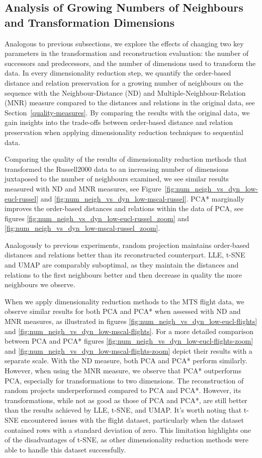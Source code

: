 \documentclass[pdftex,12pt,a4paper]{report}
\begin{document}
\FloatBarrier
\subsection{Analysis of Growing Numbers of Neighbours and Transformation Dimensions}

Analogous to previous subsections, we explore the effects of changing two key parameters in the transformation and reconstruction evaluation: the number of successors and predecessors, and the number of dimensions used to transform the data.
In every dimensionality reduction step, we quantify the order-based distance and relation preservation for a growing number of neighbours on the sequence with the Neighbour-Distance (ND) and Multiple-Neighbour-Relation (MNR) measure compared to the distances and relations in the original data, see Section~\ref{quality-measures}.
By comparing the results with the original data, we gain insights into the trade-offs between order-based distance and relation preservation when applying dimensionality reduction techniques to sequential data.


Comparing the quality of the results of dimensionality reduction methods that transformed the Russell2000 data to an increasing number of dimensions juxtaposed to the number of neighbours examined, we see similar results measured with ND and MNR measures, see Figure~\ref{fig:num_neigh_vs_dyn_low-eucl-russel} and \ref{fig:num_neigh_vs_dyn_low-mscal-russel}.
PCA* marginally improves the order-based distances and relations within the data of PCA, see figures \ref{fig:num_neigh_vs_dyn_low-eucl-russel_zoom} and \ref{fig:num_neigh_vs_dyn_low-mscal-russel_zoom}.

Analogously to previous experiments, random projection maintains order-based distances and relations better than its reconstructed counterpart.
LLE, t-SNE and UMAP are comparably suboptimal, as they maintain the distances and relations to the first neighbours better and then decrease in quality the more neighbours we observe.

When we apply dimensionality reduction methods to the MTS flight data, we observe similar results for both PCA and PCA* when assessed with ND and MNR measures, as illustrated in figures \ref{fig:num_neigh_vs_dyn_low-eucl-flights} and \ref{fig:num_neigh_vs_dyn_low-mscal-flights}.
For a more detailed comparison between PCA and PCA* figures \ref{fig:num_neigh_vs_dyn_low-eucl-flights-zoom} and \ref{fig:num_neigh_vs_dyn_low-mscal-flights-zoom} depict their results with a separate scale.
With the ND measure, both PCA and PCA* perform similarly.
However, when using the MNR measure, we observe that PCA* outperforms PCA, especially for transformations to two dimensions.
The reconstruction of random projects underperformed compared to PCA and PCA*.
However, its transformations, while not as good as those of PCA and PCA*, are still better than the results achieved by LLE, t-SNE, and UMAP.
It's worth noting that t-SNE encountered issues with the flight dataset, particularly when the dataset contained rows with a standard deviation of zero. 
This limitation highlights one of the disadvantages of t-SNE, as other dimensionality reduction methods were able to handle this dataset successfully.
\end{document}
